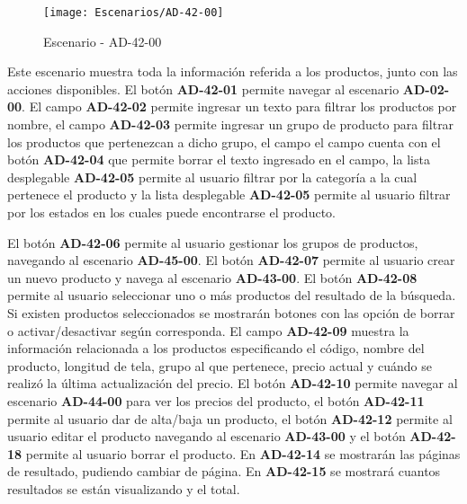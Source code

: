 \begin{figure}[H]
\centering
\texttt{[image: Escenarios/AD-42-00]}
\caption{Escenario - AD-42-00}
\label{fig:AD-42-00}
\end{figure}

Este escenario muestra toda la información referida a los productos, junto con las acciones disponibles.
El botón \textbf{AD-42-01} permite navegar al escenario \textbf{AD-02-00}. El campo \textbf{AD-42-02} permite ingresar un texto para filtrar los productos por nombre, el campo \textbf{AD-42-03} permite ingresar un grupo de producto para filtrar los productos que pertenezcan a dicho grupo, el campo el campo cuenta con el botón \textbf{AD-42-04} que permite borrar el texto ingresado en el campo, la lista desplegable \textbf{AD-42-05} permite al usuario filtrar por la categoría a la cual pertenece el producto y la lista desplegable \textbf{AD-42-05} permite al usuario filtrar por los estados en los cuales puede encontrarse el producto.

El botón \textbf{AD-42-06} permite al usuario gestionar los grupos de productos, navegando al escenario \textbf{AD-45-00}. El botón \textbf{AD-42-07} permite al usuario crear un nuevo producto y navega al escenario \textbf{AD-43-00}.
El botón \textbf{AD-42-08} permite al usuario seleccionar uno o más productos del resultado de la búsqueda. Si existen productos seleccionados se mostrarán botones con las opción de borrar o activar/desactivar según corresponda. El campo \textbf{AD-42-09} muestra la información relacionada a los productos especificando el código, nombre del producto, longitud de tela, grupo al que pertenece, precio actual y cuándo se realizó la última actualización del precio. El botón \textbf{AD-42-10} permite navegar al escenario \textbf{AD-44-00} para ver los precios del producto, el botón \textbf{AD-42-11} permite al usuario dar de alta/baja un producto, el botón \textbf{AD-42-12} permite al usuario editar el producto navegando al escenario \textbf{AD-43-00} y el botón \textbf{AD-42-18} permite al usuario borrar el producto. 
En \textbf{AD-42-14} se mostrarán las páginas de resultado, pudiendo cambiar de página. En \textbf{AD-42-15} se mostrará cuantos resultados se están visualizando y el total.
\\
